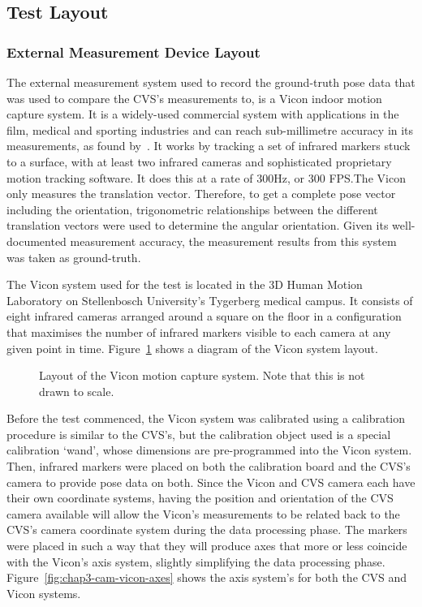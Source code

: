 \subsection{Test Layout}
\label{sec:vicon-test-setup}

\subsubsection{External Measurement Device Layout}

The external measurement system used to record the ground-truth pose data that was used to compare the CVS's measurements to, is a Vicon indoor motion capture system. It is a widely-used commercial system with applications in the film, medical and sporting industries and can reach sub-millimetre accuracy in its measurements, as found by~\cite{windolf2008systematic}. It works by tracking a set of infrared markers stuck to a surface, with at least two infrared cameras and sophisticated proprietary motion tracking software. It does this at a rate of 300Hz, or 300 FPS.\@ The Vicon only measures the translation vector. Therefore, to get a complete pose vector including the orientation, trigonometric relationships between the different translation vectors were used to determine the angular orientation. Given its well-documented measurement accuracy, the measurement results from this system was taken as ground-truth.

The Vicon system used for the test is located in the 3D Human Motion Laboratory on Stellenbosch University's Tygerberg medical campus. It consists of eight infrared cameras arranged around a square on the floor in a configuration that maximises the number of infrared markers visible to each camera at any given point in time. Figure~\ref{fig:chap3-vicon-layout} shows a diagram of the Vicon system layout. 
 
\begin{figure}
  \centering
  \def\svgwidth{0.5\textwidth}
  
  \caption[Layout of the Vicon motion capture system.]{Layout of the Vicon motion capture system. Note that this is not drawn to scale.}
\label{fig:chap3-vicon-layout}
\end{figure}

Before the test commenced, the Vicon system was calibrated using a calibration procedure is similar to the CVS's, but the calibration object used is a special calibration `wand', whose dimensions are pre-programmed into the Vicon system. Then, infrared markers were placed on both the calibration board and the CVS's camera to provide pose data on both. Since the Vicon and CVS camera each have their own coordinate systems, having the position and orientation of the CVS camera available will allow the Vicon's measurements to be related back to the CVS's camera coordinate system during the data processing phase. The markers were placed in such a way that they will produce axes that more or less coincide with the Vicon's axis system, slightly simplifying the data processing phase. Figure~\ref{fig:chap3-cam-vicon-axes} shows the axis system's for both the CVS and Vicon systems.

